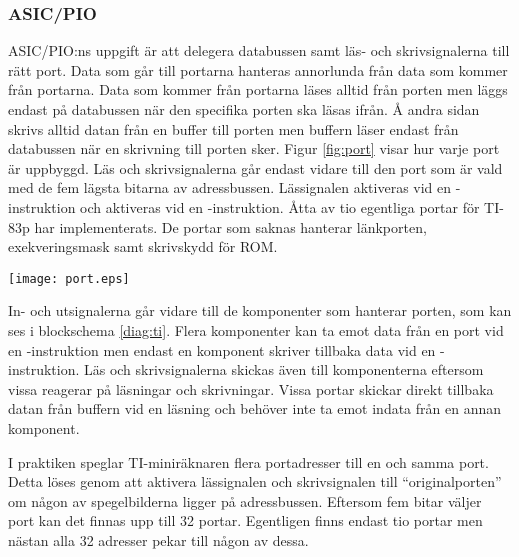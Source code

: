 \documentclass[main.tex]{subfiles}
\begin{document}
\subsubsection{ASIC/PIO}
ASIC/PIO:ns uppgift är att delegera databussen samt läs- och skrivsignalerna
till rätt port. Data som går till portarna hanteras annorlunda från data som
kommer från portarna. Data som kommer från portarna läses alltid från porten
men läggs endast på databussen när den specifika porten ska läsas ifrån. Å
andra sidan skrivs alltid datan från en buffer till porten men buffern läser
endast från databussen när en skrivning till porten sker. Figur \ref{fig:port}
visar hur varje port är uppbyggd. Läs och skrivsignalerna går endast vidare
till den port som är vald med de fem lägsta bitarna av adressbussen.
Lässignalen  aktiveras vid en -instruktion och 
aktiveras vid en -instruktion. Åtta av tio egentliga portar för
TI-83p har implementerats. De portar som saknas hanterar länkporten,
exekveringsmask samt skrivskydd för ROM.

\begin{SCfigure}
    \centering
    \texttt{[image: port.eps]}
    \caption{Implementation av en port.}
    \label{fig:port}
\end{SCfigure}

In- och utsignalerna går vidare till de komponenter som hanterar porten, som
kan ses i blockschema \ref{diag:ti}. Flera komponenter kan ta emot data från en
port vid en -instruktion men endast en komponent skriver tillbaka
data vid en -instruktion. Läs och skrivsignalerna skickas även till
komponenterna eftersom vissa reagerar på läsningar och skrivningar. Vissa
portar skickar direkt tillbaka datan från buffern vid en läsning och behöver
inte ta emot indata från en annan komponent.

I praktiken speglar TI-miniräknaren flera portadresser till en och samma port.
Detta löses genom att aktivera lässignalen och skrivsignalen till
``originalporten'' om någon av spegelbilderna ligger på adressbussen. Eftersom
fem bitar väljer port kan det finnas upp till 32 portar. Egentligen finns
endast tio portar men nästan alla 32 adresser pekar till någon av dessa.
\end{document}
